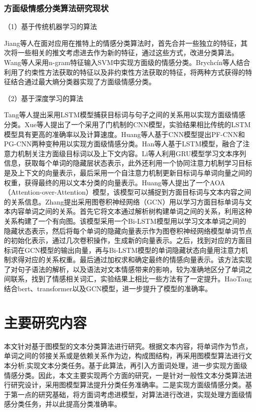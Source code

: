 \subsubsection{方面级情感分类算法研究现状}
（1）基于传统机器学习的算法

Jiang等人在面对应用在推特上的情感分类算法时，首先合并一些独立的特征，其次将一些相关的推文考虑进去作为新的特征，通过这些方式，改进分类算法。Wang等人采用n-gram特征输入SVM中实现方面级的情感分类。Brychcín等人结合利用了约束性方法获取的特征以及非约束性方法获取的特征，将两种方式获得的特征结合通过最大熵分类器实现了方面级情感分类。

（2）基于深度学习的算法

Tang等人提出采用LSTM模型捕获目标词与句子之间的关系用以实现方面级情感分类。Xue等人提出了一个采用了门机制的CNN模型，实验结果相比传统的LSTM模型具有更高的准确率以及计算速度。Huang等人基于CNN模型提出PF-CNN和PG-CNN两种变种用以实现方面级情感分类。Han等人基于LSTM模型，融合了注意力机制关注方面级目标词以及上下文内容。Li等人利用GRU模型学习文本序列信息，获取每个单词的隐藏层状态表示，此外还利用一个协同注意力机制学习目标是及上下文的向量表示，最后采用一个自注意力机制更新目标词与单词向量之间的权重，获得最终的用以文本分类的向量表示。Huang等人提出了一个AOA（Attention-over-Attention）模型，该模型可以捕捉到方面目标词与文本内容之间的关系信息。Zhang提出采用图卷积神经网络（GCN）用以学习方面目标单词与文本内容单词之间的关系。首先它将文本通过解析树构建单词之间的关系，利用这种关系构建了一个有向图。该模型采用一个Bi-LSTM模型用以学习文本单词之间的隐藏状态表示，然后将每个单词的隐藏向量表示作为图卷积神经网络模型单词节点的初始化表示，通过几次卷积操作，生成新的向量表示。之后，找到对应的方面目标词在GCN模型的输出向量，再与Bi-LSTM模型的单词隐藏状态向量用注意力机制求得对应的关系权重。最后通过加权求和确定最终的情感向量表示。该方法实现了对句子语法的解析，以及语法对文本情感带来的影响，较为准确地区分了单词之间联系，找到了情感相关词汇，实验结果上相比一些方法有了一定提升。HaoTang结合bert、transformer以及GCN模型，进一步提升了模型的准确率。

\section{主要研究内容}
本文针对基于图模型的文本分类算法进行研究。根据文本内容，将单词作为节点，单词之间的邻接关系或是依赖关系作为边，构成图结构，再采用图模型算法进行文本分析,实现文本分类任务。基于此算法，再引入方面词处理，进一步实现方面级情感分类。因此，本文主要实现两个方面的研究，一是针对一般性文本分类算法进行研究设计，采用图模型算法提升分类任务准确率。二是实现方面级情感分类。基于第一点的研究基础，将方面词考虑进模型，对算法进行改进，实现处理方面级情感分类任务，并以此提高分类准确率。
